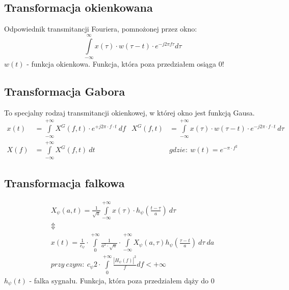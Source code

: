     \subsection{Transformacja okienkowana}
        \tab Odpowiednik transmitancji Fouriera, pomnożonej przez okno:
        \begin{equation*}
            \int \limits_{-\infty}^{\infty} x(\tau) \cdot  w(\tau-t) \cdot e^{-j2\pi f \tau}d\tau
        \end{equation*}
        $w(t)$ - funkcja okienkowa. Funkcja, która poza przedziałem osiąga 0!

    \subsection{Transformacja Gabora}
        \tab To specjalny rodzaj transmitancji okienkowej, w której okno jest funkcją Gausa.
        \begin{align*}
                x(t) &= \int \limits_{-\infty}^{+\infty} X^G(f, t)\cdot e^{+j2\pi \cdot f \cdot t}\ df &
                X^G(f, t) &= \int \limits_{-\infty}^{+\infty}x(\tau)\cdot w(\tau-t)\cdot e^{-j2\pi\cdot f\cdot t}\ d\tau\\
                X(f) &= \int \limits_{-\infty}^{+\infty} X^G(f, t)\ dt &
                &gdzie:\ w(t) = e^{-\pi\cdot f^2}
        \end{align*}
    
    \subsection{Transformacja falkowa}
    \begin{gather*}
        X_\psi(a, t) = \frac{1}{\sqrt{a}}\int\limits_{-\infty}^{+\infty}x(\tau)\cdot h_\psi\left(\frac{t-\tau}{a}\right)\ d\tau\\
        \Updownarrow\\
        x(t) = \frac{1}{c_\psi}\cdot \int\limits_{0}^{+\infty}\frac{1}{a^2\cdot\sqrt{a}}\cdot \int\limits_{-\infty}^{+\infty}X_\psi(a, \tau)h_\psi\left(\frac{\tau-t}{a}\right)\ d\tau\ da\\
        przy\ czym:\ c_\psi 2\cdot \int\limits_{0}^{+\infty}\frac{|H_\psi(f)|^2}{f}df < +\infty
    \end{gather*}
    $h_\psi(t)$ - falka sygnału. Funkcja, która poza przedziałem dąży do 0
    